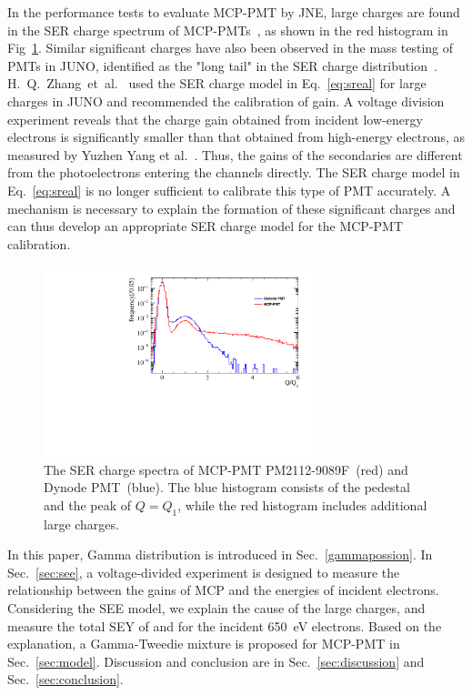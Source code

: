In the performance tests to evaluate MCP-PMT by JNE,
large charges are found in the SER charge spectrum of MCP-PMTs~\cite{Zhang:2023ued},
as shown in the red histogram in Fig~\ref{fig:spe_sreal}.
Similar significant charges have also been observed in the mass testing of PMTs in JUNO,
identified as the "long tail" in the SER charge distribution~\cite{JUNO:2022hlz}.
H.~Q.~Zhang~et~al.~\cite{2021Gain} used the SER charge model in Eq.~\eqref{eq:sreal} for large charges in JUNO
and recommended the calibration of gain.
A voltage division experiment reveals that
the charge gain obtained from incident low-energy electrons is significantly smaller than
that obtained from high-energy electrons, as measured by Yuzhen Yang et al.~\cite{2017MCP}.
Thus, the gains of the secondaries are different from the photoelectrons entering the channels directly.
The SER charge model in Eq.~\eqref{eq:sreal} is no longer sufficient to calibrate this type of PMT accurately.
A mechanism is necessary to explain the formation of these significant charges
and can thus develop an appropriate SER charge model for the MCP-PMT calibration.
\begin{figure}[ht]
    \centering
    \includegraphics[width=0.7\textwidth]{pic/spe.pdf_total.pdf}
    \caption{The SER charge spectra of MCP-PMT PM2112-9089F~(red) and Dynode PMT~(blue).
        The blue histogram consists of the pedestal and the peak of $Q=Q_1$, while the red histogram includes additional large charges.}
    \label{fig:spe_sreal}
\end{figure}


In this paper, Gamma distribution is introduced in Sec.~\ref{gammapossion}.
In Sec.~\ref{sec:see}, a voltage-divided experiment is designed to measure the relationship
between the gains of MCP and the energies of incident electrons.
Considering the SEE model, we explain the cause of the large charges, and
measure the total SEY of  and  for the incident \SI{650}{eV} electrons.
Based on the explanation, a Gamma-Tweedie mixture is proposed for MCP-PMT in Sec.~\ref{sec:model}.
Discussion and conclusion are in Sec.~\ref{sec:discussion} and Sec.~\ref{sec:conclusion}.
